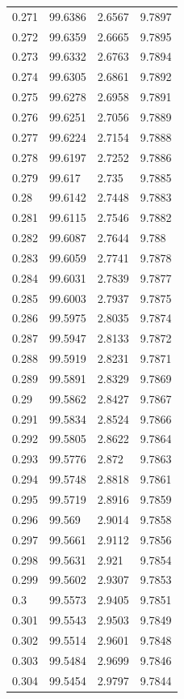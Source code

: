 \begin{tabular}{llll}
0.271 & 99.6386 & 2.6567 & 9.7897 \\
0.272 & 99.6359 & 2.6665 & 9.7895 \\
0.273 & 99.6332 & 2.6763 & 9.7894 \\
0.274 & 99.6305 & 2.6861 & 9.7892 \\
0.275 & 99.6278 & 2.6958 & 9.7891 \\
0.276 & 99.6251 & 2.7056 & 9.7889 \\
0.277 & 99.6224 & 2.7154 & 9.7888 \\
0.278 & 99.6197 & 2.7252 & 9.7886 \\
0.279 & 99.617 & 2.735 & 9.7885 \\
0.28 & 99.6142 & 2.7448 & 9.7883 \\
0.281 & 99.6115 & 2.7546 & 9.7882 \\
0.282 & 99.6087 & 2.7644 & 9.788 \\
0.283 & 99.6059 & 2.7741 & 9.7878 \\
0.284 & 99.6031 & 2.7839 & 9.7877 \\
0.285 & 99.6003 & 2.7937 & 9.7875 \\
0.286 & 99.5975 & 2.8035 & 9.7874 \\
0.287 & 99.5947 & 2.8133 & 9.7872 \\
0.288 & 99.5919 & 2.8231 & 9.7871 \\
0.289 & 99.5891 & 2.8329 & 9.7869 \\
0.29 & 99.5862 & 2.8427 & 9.7867 \\
0.291 & 99.5834 & 2.8524 & 9.7866 \\
0.292 & 99.5805 & 2.8622 & 9.7864 \\
0.293 & 99.5776 & 2.872 & 9.7863 \\
0.294 & 99.5748 & 2.8818 & 9.7861 \\
0.295 & 99.5719 & 2.8916 & 9.7859 \\
0.296 & 99.569 & 2.9014 & 9.7858 \\
0.297 & 99.5661 & 2.9112 & 9.7856 \\
0.298 & 99.5631 & 2.921 & 9.7854 \\
0.299 & 99.5602 & 2.9307 & 9.7853 \\
0.3 & 99.5573 & 2.9405 & 9.7851 \\
0.301 & 99.5543 & 2.9503 & 9.7849 \\
0.302 & 99.5514 & 2.9601 & 9.7848 \\
0.303 & 99.5484 & 2.9699 & 9.7846 \\
0.304 & 99.5454 & 2.9797 & 9.7844 \\

\end{tabular}
